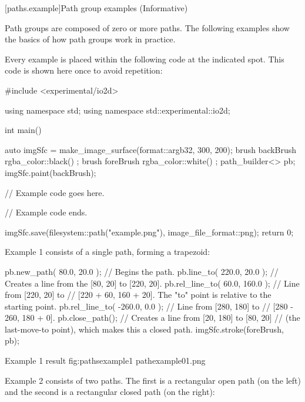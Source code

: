 

 [paths.example]{Path group examples (Informative)}%

\pnum
Path groups are composed of zero or more paths. The following examples show the basics of how path groups work in practice.

\pnum
Every example is placed within the following code at the indicated spot. This code is shown here once to avoid repetition:

\begin{codeblock}
#include <experimental/io2d>

using namespace std;
using namespace std::experimental::io2d;

int main() {
  auto imgSfc = make_image_surface(format::argb32, 300, 200);
  brush backBrush{ rgba_color::black() };
  brush foreBrush{ rgba_color::white() };
  path_builder<> pb{};
  imgSfc.paint(backBrush);
  
  // Example code goes here.

  // Example code ends.
  
  imgSfc.save(filesystem::path("example.png"), image_file_format::png);
  return 0;
}
\end{codeblock}

\pnum
Example 1 consists of a single path, forming a trapezoid:

\begin{codeblock}
  pb.new_path({ 80.0, 20.0 }); // Begins the path.
  pb.line_to({ 220.0, 20.0 }); // Creates a line from the [80, 20] to [220, 20].
  pb.rel_line_to({ 60.0, 160.0 }); // Line from [220, 20] to
    // [220 + 60, 160 + 20]. The "to" point is relative to the starting point.
  pb.rel_line_to({ -260.0, 0.0 }); // Line from [280, 180] to 
    // [280 - 260, 180 + 0].
  pb.close_path(); // Creates a line from [20, 180] to [80, 20] 
    // (the last-move-to point), which makes this a closed path.
  imgSfc.stroke(foreBrush, pb);
\end{codeblock}

\begin{importgraphiciotwod}
{Example 1 result}
{fig:pathsexample1}
{pathexample01.png}
\end{importgraphiciotwod}

\FloatBarrier

\pnum
Example 2 consists of two paths. The first is a rectangular open path (on the left) and the second is a rectangular closed path (on the right):

